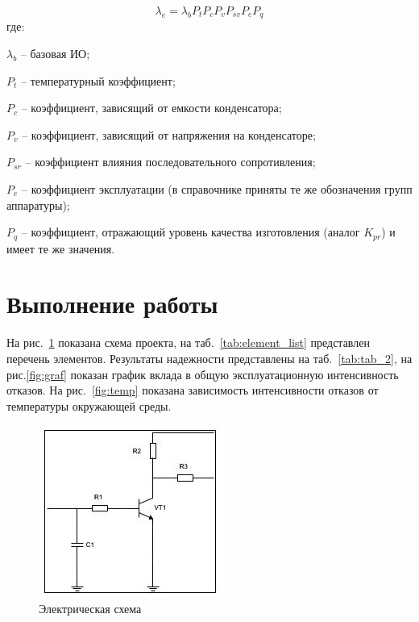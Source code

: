 \documentclass[a4paper,14pt]{article}
\begin{document}
\begin{equation}
	\lambda_{e} = \lambda_{b} P_t P_c P_v P_{sv} P_e P_q
\end{equation}
где:

$\lambda_{b}$ -- базовая ИО; 

$P_t$ -- температурный коэффициент; 

$P_c$ -- коэффициент, зависящий от емкости конденсатора; 

$P_v$ -- коэффициент, зависящий от напряжения на конденсаторе; 

$P_{sr}$ -- коэффициент влияния последовательного сопротивления; 

$P_e$ -- коэффициент эксплуатации (в справочнике приняты те же обозначения групп аппаратуры); 

$P_q$ -- коэффициент, отражающий уровень качества изготовления (аналог $K_{pr}$) и имеет те же значения.

\section{Выполнение работы}

На рис.~\ref{fig:schema1} показана схема проекта, на таб.~\ref{tab:element_list} представлен перечень элементов.
Результаты надежности представлены на таб.~\ref{tab:tab_2}, на рис.\ref{fig:graf} показан график вклада в общую эксплуатационную интенсивность отказов.
На рис.~\ref{fig:temp} показана зависимость интенсивности отказов от температуры окружающей среды.

\begin{figure}[H]
	\centering
	\includegraphics[width=0.3\linewidth]{image/schema1}
	\caption{Электрическая схема}
	\label{fig:schema1}
\end{figure}
\end{document}
